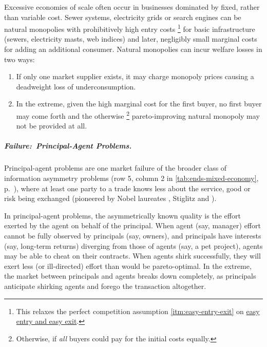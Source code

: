 Excessive economies of scale often occur in businesses dominated by fixed, rather than variable cost.
Sewer systems, electricity grids or search engines can be natural monopolies with prohibitively high entry costs
\footnote{
	This relaxes the perfect competition assumption \ref{itm:easy-entry-exit} on \hyperref[itm:easy-entry-exit]{easy entry and easy exit}.
}
for basic infrastructure (sewers, electricity masts, web indices) and later, negligibly small marginal costs for adding an additional consumer.
Natural monopolies can incur welfare losses in two ways:
\begin{enumerate}
	\item If only one market supplier exists, it may charge monopoly prices causing a deadweight loss of underconsumption.
	\item In the extreme, given the high marginal cost for the first buyer, no first buyer may come forth and the otherwise
	\footnote{
		Otherwise, if \emph{all} buyers could pay for the initial costs equally.
	}
	pareto-improving natural monopoly may not be provided at all.
\end{enumerate}

\subparagraph[Failure:\ Principal-Agent Problems]{Failure:\ Principal-Agent Problems.} \label{sec:principal-agent-problem}
Principal-agent problems are one market failure of the broader class of information asymmetry problems (row 5, column 2 in \autoref{tab:ends-mixed-economy}, p.~\pageref{tab:ends-mixed-economy}), where at least one party to a trade knows less about the service, good or risk being exchanged (pioneered by Nobel laureates \citealt{Akerlof-1970-aa}, Stiglitz \citeyear{Stiglitz1976} and \citealt{Spence1974}).

In principal-agent problems, the asymmetrically known quality is the effort exerted by the agent on behalf of the principal.
When agent (say, manager) effort cannot be fully observed by principals (say, owners), and principals have interests (say, long-term returns) diverging from those of agents (say, a pet project), agents may be able to cheat on their contracts.
When agents shirk successfully, they will exert less (or ill-directed) effort than would be pareto-optimal.
In the extreme, the market between principals and agents breaks down completely, as principals anticipate shirking agents and forego the transaction altogether.

